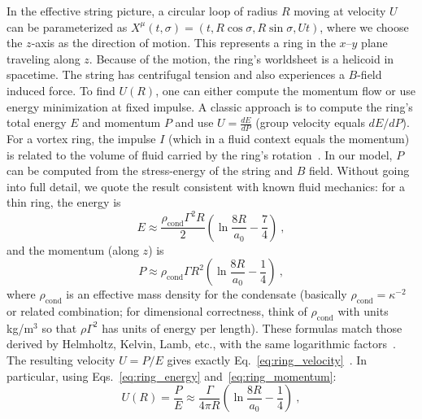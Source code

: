 \documentclass[12pt]{article}
\begin{document}
In the effective string picture, a circular loop of radius $R$ moving at velocity $U$ can be parameterized as $X^\mu(t,\sigma) = (t, R\cos\sigma, R\sin\sigma, Ut)$, where we choose the $z$-axis as the direction of motion. This represents a ring in the $x$--$y$ plane traveling along $z$. Because of the motion, the ring’s worldsheet is a helicoid in spacetime. The string has centrifugal tension and also experiences a $B$-field induced force. To find $U(R)$, one can either compute the momentum flow or use energy minimization at fixed impulse. A classic approach is to compute the ring’s total energy $E$ and momentum $P$ and use $U = \frac{dE}{dP}$ (group velocity equals $dE/dP$). For a vortex ring, the impulse $I$ (which in a fluid context equals the momentum) is related to the volume of fluid carried by the ring’s rotation~\cite{ref:lamb}. In our model, $P$ can be computed from the stress-energy of the string and $B$ field. Without going into full detail, we quote the result consistent with known fluid mechanics: for a thin ring, the energy is
\begin{equation}
    E \approx \frac{\rho_{\text{cond}} \Gamma^2 R}{2} \left(\ln\frac{8R}{a_0} - \frac{7}{4}\right)~,
    \label{eq:ring_energy}
\end{equation}
and the momentum (along $z$) is 
\begin{equation}
    P \approx \rho_{\text{cond}} \Gamma R^2 \left(\ln\frac{8R}{a_0} - \frac{1}{4}\right)~,
    \label{eq:ring_momentum}
\end{equation}
where $\rho_{\text{cond}}$ is an effective mass density for the condensate (basically $\rho_{\text{cond}} = \kappa^{-2}$ or related combination; for dimensional correctness, think of $\rho_{\text{cond}}$ with units kg/m$^3$ so that $\rho \Gamma^2$ has units of energy per length). These formulas match those derived by Helmholtz, Kelvin, Lamb, etc., with the same logarithmic factors~\cite{ref:helmholtz,ref:lamb}. The resulting velocity $U = P/E$ gives exactly Eq.~\eqref{eq:ring_velocity}~\cite{ref:saffman}. In particular, using Eqs.~\eqref{eq:ring_energy} and~\eqref{eq:ring_momentum}:
\begin{equation}
    U(R) = \frac{P}{E} \approx \frac{\Gamma}{4\pi R} \left(\ln\frac{8R}{a_0} - \frac{1}{4}\right)~,
\end{equation}
\end{document}
